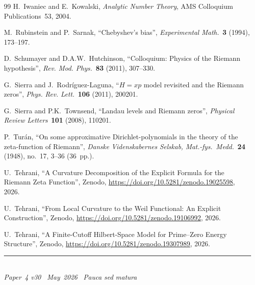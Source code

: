 \documentclass[11pt]{article}
\begin{document}
\begin{thebibliography}{99}
H.~Iwaniec and E.~Kowalski,
\emph{Analytic Number Theory},
AMS Colloquium Publications~53, 2004.

M.~Rubinstein and P.~Sarnak,
``Chebyshev's bias'',
\emph{Experimental Math.}\ \textbf{3} (1994), 173--197.

D.~Schumayer and D.A.W.~Hutchinson,
``Colloquium: Physics of the Riemann hypothesis'',
\emph{Rev. Mod. Phys.}\ \textbf{83} (2011), 307--330.

G.~Sierra and J.~Rodr\'iguez-Laguna,
``$H=xp$ model revisited and the Riemann zeros'',
\emph{Phys. Rev. Lett.}\ \textbf{106} (2011), 200201.

G.~Sierra and P.K.~Townsend,
``Landau levels and Riemann zeros'',
\emph{Physical Review Letters}\ \textbf{101} (2008), 110201.

P.~Tur\'an,
``On some approximative Dirichlet-polynomials in the theory of
the zeta-function of Riemann'',
\emph{Danske Videnskabernes Selskab, Mat.-fys.\ Medd.}\
\textbf{24} (1948), no.~17, 3--36 (36~pp.).

U.~Tehrani,
``A Curvature Decomposition of the Explicit Formula
for the Riemann Zeta Function'',
Zenodo, \url{https://doi.org/10.5281/zenodo.19025598}, 2026.

U.~Tehrani,
``From Local Curvature to the Weil Functional: An Explicit Construction'',
Zenodo, \url{https://doi.org/10.5281/zenodo.19106992}, 2026.

U.~Tehrani,
``A Finite-Cutoff Hilbert-Space Model
for Prime--Zero Energy Structure'',
Zenodo, \url{https://doi.org/10.5281/zenodo.19307989}, 2026.

\end{thebibliography}

\enlargethispage{3\baselineskip}
\vspace*{\fill}
\begin{minipage}{\linewidth}
\rule{\linewidth}{0.4pt}\smallskip\\
\small\emph{Paper~4 v30 \textperiodcentered\ May~2026
\textperiodcentered\ Pauca sed matura}
\end{minipage}
\end{document}
